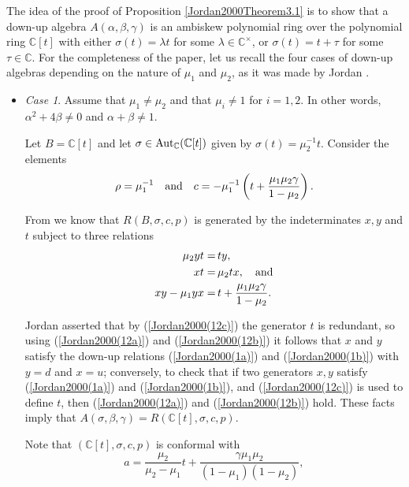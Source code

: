 \documentclass{amsart}
\theoremstyle{definition}
\theoremstyle{remark}
\numberwithin{equation}{section}
\begin{document}
The idea of the proof of Proposition \ref{Jordan2000Theorem3.1} is to show that a down-up algebra $A(\alpha, \beta, \gamma)$ is an ambiskew polynomial ring over the polynomial ring $\mathbb{C}[t]$ with either $\sigma(t) = \lambda t$ for some $\lambda\in \mathbb{C}^{\times}$, or $\sigma(t) = t + \tau$ for some $\tau \in \mathbb{C}$. For the completeness of the paper, let us recall the four cases of down-up algebras depending on the nature of $\mu_1$ and $\mu_2$, as it was made by Jordan \cite[Section 3]{Jordan2000}.

\begin{itemize}
    \item {\em Case 1}. Assume that $\mu_1 \neq \mu_2$ and that $\mu_i \neq 1$ for $i = 1, 2$. In other words, $\alpha^2 + 4\beta \neq 0$ and $\alpha + \beta \neq 1$.
    
    Let $B = \mathbb{C}[t]$ and let $\sigma\in {\rm Aut}_{\mathbb{C}}(\mathbb{C}[t])$ given by $\sigma(t) = \mu_2^{-1}t$. Consider the elements 
    $$
    \rho = \mu_1^{-1} \quad {\rm and} \quad c = -\mu_1^{-1}\left( t +  \frac{\mu_1 \mu_2 \gamma}{ 1 - \mu_2} \right).
    $$

   From \cite[Proposition 1]{DumasJordan1996} we know that $R(B, \sigma, c, p)$ is generated by the indeterminates $x, y$ and $t$ subject to three relations
\begin{align}
    \mu_2 y t = &\, ty, \label{Jordan2000(12a)} \\
    xt = &\, \mu_2 tx, \quad {\rm and} \label{Jordan2000(12b)} \\
    xy - \mu_1 yx = &\, t + \frac{\mu_1 \mu_2 \gamma}{1 - \mu_2}. \label{Jordan2000(12c)}
\end{align}

Jordan asserted that by (\ref{Jordan2000(12c)}) the generator $t$ is redundant, so using (\ref{Jordan2000(12a)}) and (\ref{Jordan2000(12b)}) it follows that $x$ and $y$ satisfy the down-up relations (\ref{Jordan2000(1a)}) and (\ref{Jordan2000(1b)}) with $y = d$ and $x = u$; conversely, to check that if two generators $x, y$ satisfy (\ref{Jordan2000(1a)}) and (\ref{Jordan2000(1b)}), and (\ref{Jordan2000(12c)}) is used to define $t$, then (\ref{Jordan2000(12a)}) and (\ref{Jordan2000(12b)}) hold. These facts imply that $A(\sigma, \beta, \gamma) = R\left( \mathbb{C}[t], \sigma, c, p\right)$. 

Note that $(\mathbb{C}[t], \sigma, c, p)$ is conformal with 
$$
a = \frac{\mu_2}{\mu_2 - \mu_1} t + \frac{\gamma \mu_1 \mu_2}{(1 - \mu_1) (1 - \mu_2)},
$$


\end{itemize}
\end{document}
